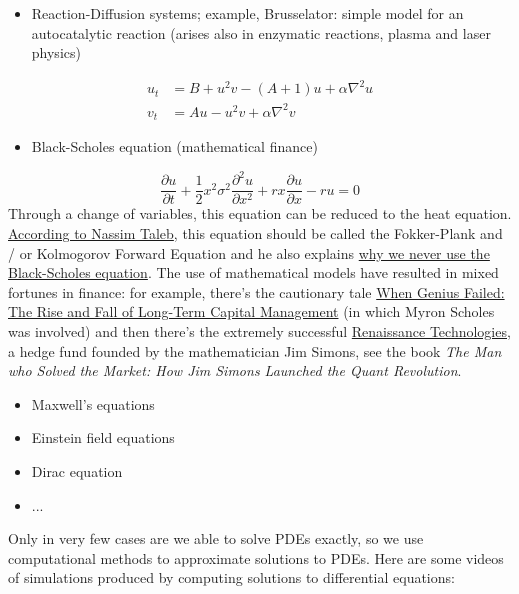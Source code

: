 \documentclass[12pt,landscape]{article}
\begin{document}
{\begin{itemize}
\item Reaction-Diffusion systems; example, Brusselator: simple model for an autocatalytic reaction (arises also in enzymatic reactions, plasma and laser physics)

\end{itemize}

\begin{align*}
u_t &= B + u^2 v - (A+1) u + \alpha \nabla^2 u \\ 
v_t &= Au  - u^2 v + \alpha \nabla^2 v
\end{align*}
\begin{itemize}
\item Black-Scholes equation (mathematical finance)

\end{itemize}
\[
\frac{\partial u}{\partial t} + \frac{1}{2}x^2\sigma^2 \frac{\partial^2 u}{\partial x^2} + rx \frac{\partial u}{\partial x} - ru = 0
\]
Through a change of variables, this equation can be reduced to the heat equation. \href{https://twitter.com/nntaleb/status/1596178404675551239}{According to Nassim Taleb}, this equation should be called the Fokker-Plank and / or Kolmogorov Forward Equation and he also explains \href{https://www.youtube.com/watch?v=UoGlUZPNouM}{why we never use the Black-Scholes equation}.   The use of mathematical models have resulted in mixed fortunes in finance: for example, there's the cautionary tale \href{https://en.wikipedia.org/wiki/When_Genius_Failed}{When Genius Failed: The Rise and Fall of Long-Term Capital Management} (in which Myron Scholes was involved) and then there's the extremely successful \href{https://en.wikipedia.org/wiki/Renaissance_Technologies}{Renaissance Technologies}, a hedge fund founded by the mathematician Jim Simons, see the book \emph{The Man who Solved the Market: How Jim Simons Launched the Quant Revolution}. 

\begin{itemize}
\item Maxwell's equations 


\item Einstein field equations


\item Dirac equation


\item ...

\end{itemize}
Only in very few cases are we able to solve PDEs exactly, so we use computational methods to approximate solutions to PDEs. Here are some videos of simulations produced by computing solutions to differential equations:

}
\end{document}
